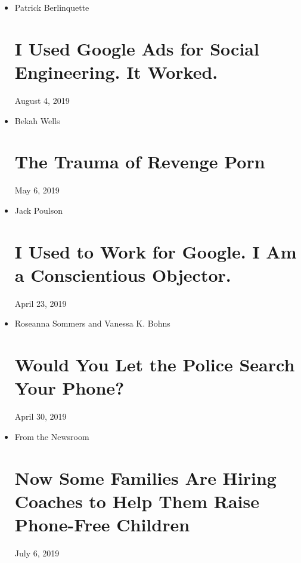 \begin{itemize}
\item
  Patrick Berlinquette

  \href{https://www.nytimes.com/2019/07/07/opinion/google-ads.html}{}

  \hypertarget{i-used-google-ads-for-social-engineering-it-worked}{%
  \section{I Used Google Ads for Social Engineering. It
  Worked.}\label{i-used-google-ads-for-social-engineering-it-worked}}

  August 4, 2019
\item
  Bekah Wells

  \href{https://www.nytimes.com/2019/08/04/opinion/revenge-porn-privacy.html}{}

  \hypertarget{the-trauma-of-revenge-porn}{%
  \section{The Trauma of Revenge
  Porn}\label{the-trauma-of-revenge-porn}}

  May 6, 2019
\item
  Jack Poulson

  \href{https://www.nytimes.com/2019/04/23/opinion/google-privacy-china.html}{}

  \hypertarget{i-used-to-work-for-google-i-am-a-conscientious-objector}{%
  \section{I Used to Work for Google. I Am a Conscientious
  Objector.}\label{i-used-to-work-for-google-i-am-a-conscientious-objector}}

  April 23, 2019
\item
  Roseanna Sommers and Vanessa K. Bohns

  \href{https://www.nytimes.com/2019/04/30/opinion/police-phone-privacy.html}{}

  \hypertarget{would-you-let-the-police-search-your-phone}{%
  \section{Would You Let the Police Search Your
  Phone?}\label{would-you-let-the-police-search-your-phone}}

  April 30, 2019
\item
  From the Newsroom

  \href{https://www.nytimes.com/2019/07/06/style/parenting-coaches-screen-time-phones.html}{}

  \hypertarget{now-some-families-are-hiring-coaches-to-help-them-raise-phone-free-children}{%
  \section{Now Some Families Are Hiring Coaches to Help Them Raise
  Phone-Free
  Children}\label{now-some-families-are-hiring-coaches-to-help-them-raise-phone-free-children}}

  July 6, 2019
\end{itemize}

